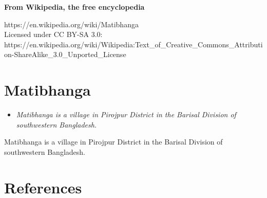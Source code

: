 \textbf{From Wikipedia, the free encyclopedia}

https://en.wikipedia.org/wiki/Matibhanga\\
Licensed under CC BY-SA 3.0:\\
https://en.wikipedia.org/wiki/Wikipedia:Text\_of\_Creative\_Commons\_Attribution-ShareAlike\_3.0\_Unported\_License

\section{Matibhanga}\label{matibhanga}

\begin{itemize}
\item
  \emph{Matibhanga is a village in Pirojpur District in the Barisal
  Division of southwestern Bangladesh.}
\end{itemize}

Matibhanga is a village in Pirojpur District in the Barisal Division of
southwestern Bangladesh.

\section{References}\label{references}
